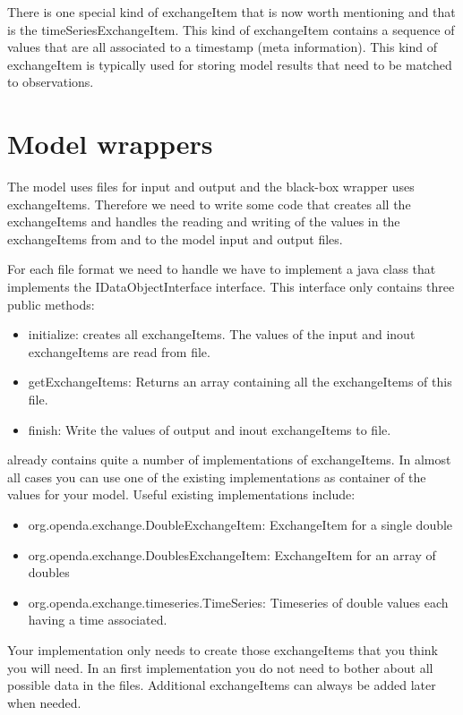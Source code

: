There is one special kind of exchangeItem that is now worth mentioning and that
is the timeSeriesExchangeItem. This kind of exchangeItem contains a sequence of
values that are all associated to a timestamp (meta information). This kind of
exchangeItem is typically used for storing model results that need to be
matched to observations.

\section{Model wrappers}
The model uses files for input and output and the black-box wrapper uses
exchangeItems. Therefore we need to write some code that creates all the
exchangeItems and handles the reading and writing of the values in the
exchangeItems from and to the model input and output files.

For each file format we need to handle we have to implement a java class that
implements the IDataObjectInterface interface. This interface only contains three
public methods:
\begin{itemize}
\item initialize: creates all exchangeItems. The values of the input and inout
  exchangeItems are read from file.
\item getExchangeItems: Returns an array containing all the exchangeItems of
  this file.
\item finish: Write the values of output and inout exchangeItems to file.
\end{itemize}

\oda already contains quite a number of implementations of exchangeItems. In
almost all cases you can use one of the existing implementations as container
of the values for your model. Useful existing implementations include:
\begin{itemize}
\item org.openda.exchange.DoubleExchangeItem: ExchangeItem for a single double
\item org.openda.exchange.DoublesExchangeItem: ExchangeItem for an array of
  doubles
\item org.openda.exchange.timeseries.TimeSeries: Timeseries of double values
  each having a time associated.
\end{itemize}

Your implementation only needs to create those exchangeItems that you think you
will need. In an first implementation you do not need to bother about all
possible data in the files. Additional exchangeItems can always be added later
when needed.

